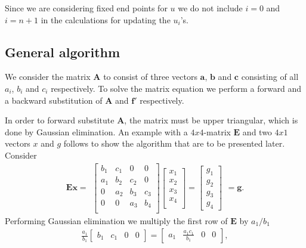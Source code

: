 \documentclass{emulateapj}
\begin{document}
%
Since we are considering fixed end points for $u$ we do not include $i = 0$ and $i = n+1$ in the calculations for updating the $u_i$'s. 

\subsection{General algorithm}
We consider the matrix $\boldsymbol{A}$ to consist of three vectors $\boldsymbol{a}$, $\boldsymbol{b}$ and $\boldsymbol{c}$ consisting of all $a_i$, $b_i$ and $c_i$ respectively. To solve the matrix equation we perform a forward and a backward substitution of $\boldsymbol{A}$ and $\boldsymbol{f'}$ respectively.

In order to forward substitute $\boldsymbol{A}$, the matrix must be upper triangular, which is done by Gaussian elimination. An example with a $4x4$-matrix $\boldsymbol{E}$ and two $4x1$ vectors $x$ and $g$ follows to show the algorithm that are to be presented later. Consider 
%
\[ \boldsymbol{Ex} =
\begin{array}{c}
\begin{bmatrix}\label{eq:Au=f}
b_1     & c_1           & 0         & 0 \\
a_1     & b_2           & c_2       & 0       \\
0       & a_2           & b_3       & c_3    \\
0  &  0            & a_3       & b_4     \\
\end{bmatrix}
\begin{bmatrix}
x_1 \\
x_2 \\
x_3 \\
x_4 \\
\end{bmatrix}
=
\begin{bmatrix}
g_1 \\
g_2 \\
g_3 \\
g_4
\end{bmatrix}
\end{array}
= \boldsymbol{g}.
\]
%
Performing Gaussian elimination we multiply the first row of $\boldsymbol{E}$ by $a_1/b_1$
%
\begin{gather*}
    \frac{a_1}{b_1}\begin{bmatrix} b_1 & c_1 & 0 & 0 \end{bmatrix} =  \begin{bmatrix} a_1 & \frac{a_1 c_1}{b_1} & 0 & 0\end{bmatrix},
\end{gather*}
\end{document}
